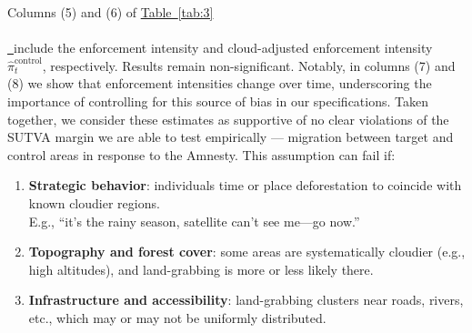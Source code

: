 \documentclass[12pt]{article}
\newcommand*{\tabref}[2][]{%
  \hyperref[{tab:#2}]{%
    Table~\ref*{tab:#2}%
    \ifx\\#1\\%
    \else
      \,#1%
    \fi
  }%
}
\begin{document}
\quad Columns (5) and (6) of \tabref{3} include the enforcement intensity and cloud-adjusted enforcement intensity $\widehat{\pi}_t^{\text{control}}$, respectively. Results remain non-significant. Notably, in columns (7) and (8) we show that enforcement intensities change over time, underscoring the importance of controlling for this source of bias in our specifications. Taken together, we consider these estimates as supportive of no clear violations of the SUTVA margin we are able to test empirically --- migration between target and control areas in response to the Amnesty. 
\iffalse
This assumption can fail if:

\begin{enumerate}
  \item \textbf{Strategic behavior}: individuals time or place deforestation to coincide with known cloudier regions.\\
  E.g., “it’s the rainy season, satellite can’t see me—go now.”
  \item \textbf{Topography and forest cover}: some areas are systematically cloudier (e.g., high altitudes), and land-grabbing is more or less likely there.
  \item \textbf{Infrastructure and accessibility}: land-grabbing clusters near roads, rivers, etc., which may or may not be uniformly distributed.
\end{enumerate}
\end{document}
